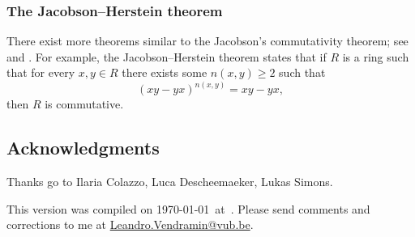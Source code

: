 \subsubsection*{The Jacobson--Herstein theorem}

There exist more theorems similar to 
the Jacobson's commutativity theorem; see \cite{MR1838439} and \cite{MR2319575}. For example, 
the Jacobson--Herstein theorem states that  
if $R$ is a ring
such that for every $x,y\in R$ there exists some
$n(x,y)\geq2$ such that 
\[
(xy-yx)^{n(x,y)}=xy-yx,
\]
then $R$ is commutative.

\subsection*{Acknowledgments}

Thanks go to Ilaria Colazzo, 
Luca Descheemaeker, Lukas Simons.   

\bigskip 
This version 
was compiled on \today~at~\currenttime.
Please send comments and corrections to me at \url{Leandro.Vendramin@vub.be}. 


